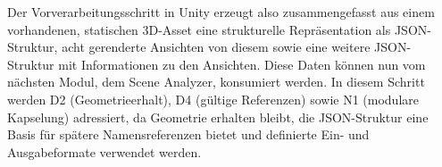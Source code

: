 Der Vorverarbeitungsschritt in Unity erzeugt also zusammengefasst aus einem vorhandenen, statischen 3D-Asset eine strukturelle Repräsentation als JSON-Struktur, acht gerenderte Ansichten von diesem sowie eine weitere JSON-Struktur mit Informationen zu den Ansichten.
Diese Daten können nun vom nächsten Modul, dem Scene Analyzer, konsumiert werden.
In diesem Schritt werden D2 (Geometrieerhalt), D4 (gültige Referenzen) sowie N1 (modulare Kapselung) adressiert, da Geometrie erhalten bleibt, die JSON-Struktur eine Basis für spätere Namensreferenzen bietet und definierte Ein- und Ausgabeformate verwendet werden.






